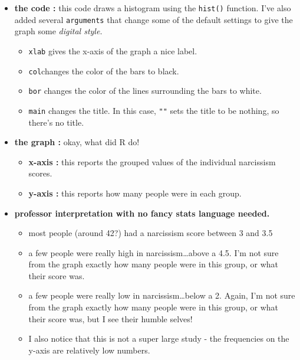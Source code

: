 \documentclass[
  letterpaper,
  DIV=11,
  numbers=noendperiod,
  oneside]{scrreprt}
\begin{document}
\begin{itemize}
\item
  \textbf{the code :} this code draws a histogram using the
  \texttt{hist()} function. I've also added several \texttt{arguments}
  that change some of the default settings to give the graph some
  \emph{digital style.}

  \begin{itemize}
  \item
    \texttt{xlab} gives the x-axis of the graph a nice label.
  \item
    \texttt{col}changes the color of the bars to black.
  \item
    \texttt{bor} changes the color of the lines surrounding the bars to
    white.
  \item
    \texttt{main} changes the title. In this case, \texttt{""} sets the
    title to be nothing, so there's no title.
  \end{itemize}
\item
  \textbf{the graph :} okay, what did R do!

  \begin{itemize}
  \item
    \textbf{x-axis :} this reports the grouped values of the individual
    narcissism scores.~
  \item
    \textbf{y-axis :} this reports how many people were in each group.
  \end{itemize}
\item
  \textbf{professor interpretation with no fancy stats language needed.}

  \begin{itemize}
  \item
    most people (around 42?) had a narcissism score between 3 and 3.5
  \item
    a few people were really high in narcissism\ldots above a 4.5. I'm
    not sure from the graph exactly how many people were in this group,
    or what their score was.
  \item
    a few people were really low in narcissism\ldots below a 2. Again,
    I'm not sure from the graph exactly how many people were in this
    group, or what their score was, but I see their humble selves!
  \item
    I also notice that this is not a super large study - the frequencies
    on the y-axis are relatively low numbers.
  \end{itemize}
\end{itemize}
\end{document}
